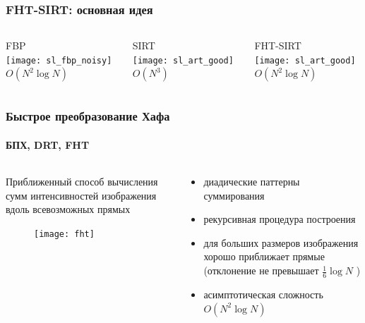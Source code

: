 
\begin{frame}
\frametitle{FHT-SIRT: основная идея}
\centering
\begin{columns}
\begin{column}{0.35\textwidth}
\centering
FBP\\
\vspace{20pt}
\texttt{[image: sl\_fbp\_noisy]}\\
\vspace{20pt}
$O(N^2 \log N)$
\end{column}
\vrule{}
\begin{column}{0.35\textwidth}
\centering
SIRT\\
\vspace{20pt}
\texttt{[image: sl\_art\_good]}\\
\vspace{20pt}
$O(N^3)$
\end{column}
\vrule{}
\begin{column}{0.35\textwidth}
\centering
FHT-SIRT\\
\vspace{20pt}
\texttt{[image: sl\_art\_good]}\\
\vspace{20pt}
$O(N^2 \log N)$
\end{column}
\end{columns}
\end{frame}

\begin{frame}
\frametitle{Быстрое преобразование Хафа}
\framesubtitle{БПХ, DRT, FHT}
\begin{columns}[T,onlytextwidth]
  \hspace*{-0.5cm}
  \begin{column}{0.65\textwidth}
  Приближенный способ вычисления сумм интенсивностей изображения вдоль всевозможных прямых
  \begin{figure}
    \texttt{[image: fht]}
  \end{figure}
  \end{column}
  \begin{column}{0.45\textwidth}
  \begin{itemize}
    \item диадические паттерны суммирования
    \item рекурсивная процедура построения
    \item для больших размеров изображения хорошо приближает прямые (отклонение не превышает  $\frac 1 6 \log N$ ) %
    \item асимптотическая сложность $O(N^2 \log N)$
  \end{itemize}
  \end{column}
\end{columns}

\end{frame}

